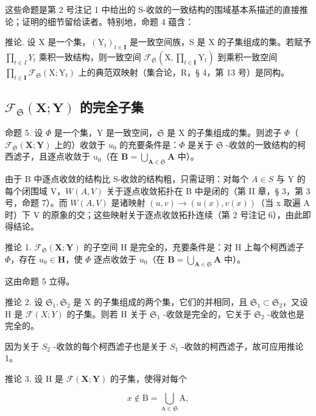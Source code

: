 这些命题是第 2 号注记 1 中给出的 S-收敛的一致结构的围域基本系描述的直接推论；证明的细节留给读者。特别地，命题 4 蕴含：

推论. 设 X 是一个集，\((\mathrm{Y}_{t})_{t\in\mathbf{I}}\) 是一致空间族，S 是 X 的子集组成的集。若赋予 \(\prod_{t\in I}Y_{t}\) 乘积一致结构，则一致空间 \(\mathcal{F}_{\mathfrak{S}}\left(\mathrm{X},\prod_{t\in\mathbf{I}}\mathrm{Y}_{t}\right)\) 到乘积一致空间 \(\prod_{t\in\mathbf{I}}\mathcal{F}_{\mathfrak{S}}(\mathrm{X};\mathrm{Y}_{t})\) 上的典范双映射（集合论，R，§ 4，第 13 号）是同构。

\subsection{\texorpdfstring{\(\mathcal{F}_{\mathfrak{S}}(\mathbf{X};\mathbf{Y})\) 的完全子集}{F 下标 S (X;Y) 的完全子集}}

命题 5. 设 \(\Phi\) 是一个集，Y 是一致空间，\(\mathfrak{S}\) 是 X 的子集组成的集。则滤子 \(\Phi\)（\(\mathcal{F}_{\mathfrak{S}}(\mathbf{X};\mathbf{Y})\) 上的）收敛于 \(u_0\) 的充要条件是：\(\Phi\) 是关于 \(\mathfrak{S}\) -收敛的一致结构的柯西滤子，且逐点收敛于 \(u_0\)（在 \(\mathbf{B} = \bigcup_{\mathbf{A}\in \mathfrak{S}}\mathbf{A}\) 中）。

由于 B 中逐点收敛的结构比 S-收敛的结构粗，只需证明：对每个 \(A \in S\) 与 Y 的每个闭围域 V，\(W(A, V)\) 关于逐点收敛拓扑在 B 中是闭的（第 II 章，§ 3，第 3 号，命题 7）。而 \(W(A, V)\) 是诸映射 \((u, v) \to (u(x), v(x))\)（当 x 取遍 A 时）下 V 的原象的交；这些映射关于逐点收敛拓扑连续（第 2 号注记 6），由此即得结论。

推论 1. \(\mathcal{F}_{\mathfrak{S}}(\mathbf{X};\mathbf{Y})\) 的子空间 H 是完全的，充要条件是：对 H 上每个柯西滤子 \(\Phi\)，存在 \(u_0\in \mathbf{H}\)，使 \(\Phi\) 逐点收敛于 \(u_0\)（在 \(\mathbf{B} = \bigcup_{\mathbf{A}\in \mathfrak{S}}\mathbf{A}\) 中）。

这由命题 5 立得。

推论 2. 设 \(\mathfrak{S}_1, \mathfrak{S}_2\) 是 X 的子集组成的两个集，它们的并相同，且 \(\mathfrak{S}_1 \subset \mathfrak{S}_2\)，又设 H 是 \(\mathcal{F}(X; Y)\) 的子集。则若 H 关于 \(\mathfrak{S}_1\) -收敛是完全的，它关于 \(\mathfrak{S}_2\) -收敛也是完全的。

因为关于 \(S_{2}\) -收敛的每个柯西滤子也是关于 \(S_{1}\) -收敛的柯西滤子，故可应用推论 1。

推论 3. 设 H 是 \(\mathcal{F}(\mathbf{X};\mathbf{Y})\) 的子集，使得对每个

\[
x \notin \mathrm{B} = \bigcup_ {\mathrm{A} \in \mathfrak {S}} \mathrm{A},
\]

